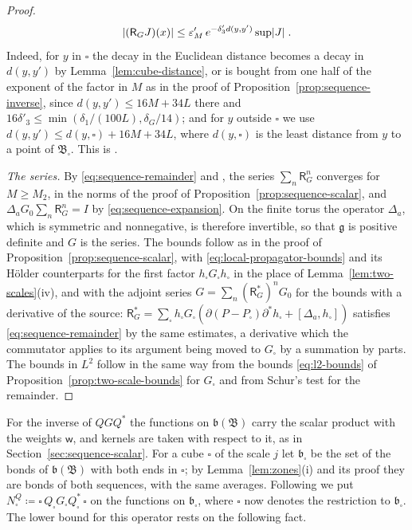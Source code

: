 \documentclass[11pt]{preprint}
\DeclarePairedDelimiter{\abs}{\lvert}{\rvert}
\numberwithin{equation}{section}
\theoremstyle{definition}
\theoremstyle{remark}
\theoremstyle{plain}
\begin{document}
\begin{proof}
\begin{equation}\label{eq:sequence-remainder}
    \abs{(\mathsf R_GJ)(x)} \leq \varepsilon'_M\,e^{-\delta'_3d(y, y')}\sup\abs J\;.
\end{equation}
Indeed, for $y$ in $\square$ the decay in the Euclidean distance becomes a decay in $d(y, y')$ by Lemma~\ref{lem:cube-distance}, or is bought from one half of the exponent of the factor in $M$ as in the proof of Proposition~\ref{prop:sequence-inverse}, since $d(y, y') \leq 16M + 34L$ there and $16\delta'_3 \leq \min(\delta_1/(100L), \delta_G/14)$; and for $y$ outside $\square$ we use $d(y, y') \leq d(y, \square) + 16M + 34L$, where $d(y, \square)$ is the least distance from $y$ to a point of $\mathfrak B_\square$. This is \cite[(2.135)]{BalabanPRT2}.

\emph{The series.} By \eqref{eq:sequence-remainder} and \cite[(2.61)]{BalabanPRT2}, the series $\sum_n\mathsf R_G^n$ converges for $M \geq M_2$, in the norms of the proof of Proposition~\ref{prop:sequence-scalar}, and $\Delta_aG_0\sum_n\mathsf R_G^n = I$ by \eqref{eq:sequence-expansion}. On the finite torus the operator $\Delta_a$, which is symmetric and nonnegative, is therefore invertible, so that $\mathfrak g$ is positive definite and $G$ is the series. The bounds \cite[(2.136)--(2.139)]{BalabanPRT2} follow as in the proof of Proposition~\ref{prop:sequence-scalar}, with \eqref{eq:local-propagator-bounds} and its H\"older counterparts for the first factor $h_\square G_\square h_\square$ in the place of Lemma~\ref{lem:two-scales}(iv), and with the adjoint series $G = \sum_n(\mathsf R_G^*)^nG_0$ for the bounds with a derivative of the source: $\mathsf R_G^* = \sum_\square h_\square G_\square(\partial(P - P_\square)\partial^*h_\square + [\Delta_a, h_\square])$ satisfies \eqref{eq:sequence-remainder} by the same estimates, a derivative which the commutator applies to its argument being moved to $G_\square$ by a summation by parts. The bounds \cite[(2.140)]{BalabanPRT2} in $L^2$ follow in the same way from the bounds \eqref{eq:l2-bounds} of Proposition~\ref{prop:two-scale-bounds} for $G_\square$ and from Schur's test for the remainder.
\end{proof}

For the inverse of $QGQ^*$ the functions on $\mathfrak b(\mathfrak B)$ carry the scalar product with the weights $\mathsf w$, and kernels are taken with respect to it, as in Section~\ref{sec:sequence-scalar}. For a cube $\square$ of the scale $j$ let $\mathfrak b_\square$ be the set of the bonds of $\mathfrak b(\mathfrak B)$ with both ends in $\square$; by Lemma~\ref{lem:zones}(i) and its proof they are bonds of both sequences, with the same averages. Following \cite[(2.143)]{BalabanPRT2} we put $N^Q_\square \coloneqq \square\,Q_\square G_\square Q_\square^*\,\square$ on the functions on $\mathfrak b_\square$, where $\square$ now denotes the restriction to $\mathfrak b_\square$. The lower bound for this operator rests on the following fact.
\end{document}
